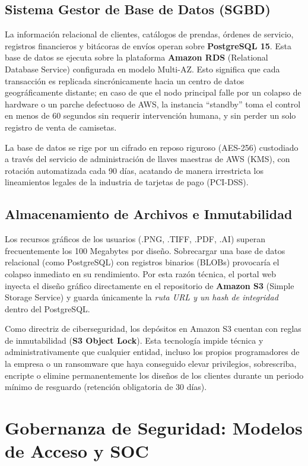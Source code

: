 \documentclass[11pt,a4paper]{article}
\begin{document}
\subsection{Sistema Gestor de Base de Datos (SGBD)}
La información relacional de clientes, catálogos de prendas, órdenes de servicio, registros financieros y bitácoras de envíos operan sobre \textbf{PostgreSQL 15}. Esta base de datos se ejecuta sobre la plataforma \textbf{Amazon RDS} (Relational Database Service) configurada en modelo Multi-AZ. Esto significa que cada transacción es replicada sincrónicamente hacia un centro de datos geográficamente distante; en caso de que el nodo principal falle por un colapso de hardware o un parche defectuoso de AWS, la instancia \enquote{standby} toma el control en menos de 60 segundos sin requerir intervención humana, y sin perder un solo registro de venta de camisetas. 

La base de datos se rige por un cifrado en reposo riguroso (AES-256) custodiado a través del servicio de administración de llaves maestras de AWS (KMS), con rotación automatizada cada 90 días, acatando de manera irrestricta los lineamientos legales de la industria de tarjetas de pago (PCI-DSS).

\subsection{Almacenamiento de Archivos e Inmutabilidad}
Los recursos gráficos de los usuarios (.PNG, .TIFF, .PDF, .AI) superan frecuentemente los 100 Megabytes por diseño. Sobrecargar una base de datos relacional (como PostgreSQL) con registros binarios (BLOBs) provocaría el colapso inmediato en su rendimiento. Por esta razón técnica, el portal web inyecta el diseño gráfico directamente en el repositorio de \textbf{Amazon S3} (Simple Storage Service) y guarda únicamente la \textit{ruta URL y un hash de integridad} dentro del PostgreSQL.

Como directriz de ciberseguridad, los depósitos en Amazon S3 cuentan con reglas de inmutabilidad (\textbf{S3 Object Lock}). Esta tecnología impide técnica y administrativamente que cualquier entidad, incluso los propios programadores de la empresa o un ransomware que haya conseguido elevar privilegios, sobrescriba, encripte o elimine permanentemente los diseños de los clientes durante un periodo mínimo de resguardo (retención obligatoria de 30 días).

\section{Gobernanza de Seguridad: Modelos de Acceso y SOC}
\end{document}
